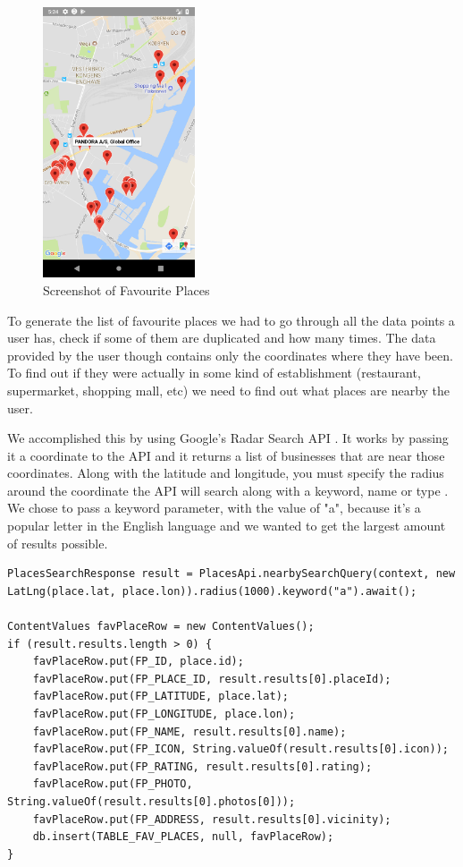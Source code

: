 \documentclass[12p]{article}
\begin{document}
    \begin{figure}[ht]
        \center
        \includegraphics[height=8cm,keepaspectratio]{pics/fav-places-screenshot.png}
        \caption{Screenshot of Favourite Places}
    \end{figure}
    To generate the list of favourite places we had to go through all the data points a user has, check if some of them are duplicated and how many times. The data provided by the user though contains only the coordinates where they have been. To find out if they were actually in some kind of establishment (restaurant, supermarket, shopping mall, etc) we need to find out what places are nearby the user. 
    
    We accomplished this by using Google's Radar Search API \cite{GoogleRadarSearch}. It works by passing it a coordinate to the API and it returns a list of businesses that are near those coordinates. Along with the latitude and longitude, you must specify the radius around the coordinate the API will search along with a keyword, name or type \cite{GoogleAPISupportedTypes}. We chose to pass a keyword parameter, with the value of "a", because it's a popular letter in the English language and we wanted to get the largest amount of results possible.
    
\begin{verbatim}
PlacesSearchResponse result = PlacesApi.nearbySearchQuery(context, new LatLng(place.lat, place.lon)).radius(1000).keyword("a").await();

ContentValues favPlaceRow = new ContentValues();
if (result.results.length > 0) {
    favPlaceRow.put(FP_ID, place.id);
    favPlaceRow.put(FP_PLACE_ID, result.results[0].placeId);
    favPlaceRow.put(FP_LATITUDE, place.lat);
    favPlaceRow.put(FP_LONGITUDE, place.lon);
    favPlaceRow.put(FP_NAME, result.results[0].name);
    favPlaceRow.put(FP_ICON, String.valueOf(result.results[0].icon));
    favPlaceRow.put(FP_RATING, result.results[0].rating);
    favPlaceRow.put(FP_PHOTO, String.valueOf(result.results[0].photos[0]));
    favPlaceRow.put(FP_ADDRESS, result.results[0].vicinity);
    db.insert(TABLE_FAV_PLACES, null, favPlaceRow);
}
\end{verbatim}
    
\end{document}
